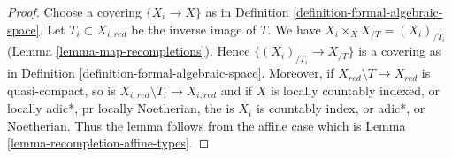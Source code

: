\documentclass{stacks-project}
\theoremstyle{plain}
\theoremstyle{definition}
\theoremstyle{remark}
\numberwithin{equation}{subsection}
\begin{document}
\begin{proof}
Choose a covering $\{X_i \to X\}$ as in
Definition \ref{definition-formal-algebraic-space}.
Let $T_i \subset X_{i, red}$ be the inverse image of $T$.
We have $X_i \times_X X_{/T} = (X_i)_{/T_i}$
(Lemma \ref{lemma-map-recompletions}).
Hence $\{(X_i)_{/T_i} \to X_{/T}\}$ is a covering as in
Definition \ref{definition-formal-algebraic-space}.
Moreover, if $X_{red} \setminus T \to X_{red}$ is quasi-compact, so is
$X_{i, red} \setminus T_i \to X_{i, red}$
and if $X$ is locally countably indexed, or locally adic*, pr
locally Noetherian, the is $X_i$ is countably index, or adic*,
or Noetherian. Thus the lemma follows from the affine case which is
Lemma \ref{lemma-recompletion-affine-types}.
\end{proof}
\end{document}
